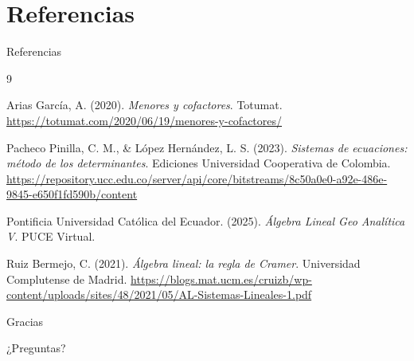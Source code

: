\documentclass[aspectratio=169]{beamer}
\begin{document}
\section{Referencias}

\begin{frame}[shrink=12]{Referencias}
\footnotesize
\begin{thebibliography}{9}

Arias García, A. (2020). \textit{Menores y cofactores}. Totumat. \url{https://totumat.com/2020/06/19/menores-y-cofactores/}

Pacheco Pinilla, C. M., \& López Hernández, L. S. (2023). \textit{Sistemas de ecuaciones: método de los determinantes}. Ediciones Universidad Cooperativa de Colombia. \url{https://repository.ucc.edu.co/server/api/core/bitstreams/8c50a0e0-a92e-486e-9845-e650f1fd590b/content}

Pontificia Universidad Católica del Ecuador. (2025). \textit{Álgebra Lineal Geo Analítica V}. PUCE Virtual.

Ruiz Bermejo, C. (2021). \textit{Álgebra lineal: la regla de Cramer}. Universidad Complutense de Madrid. \url{https://blogs.mat.ucm.es/cruizb/wp-content/uploads/sites/48/2021/05/AL-Sistemas-Lineales-1.pdf}

\end{thebibliography}
\end{frame}

\begin{frame}
\centering
\Huge Gracias

\vspace{0.4cm}
\Large ¿Preguntas?
\end{frame}
\end{document}
